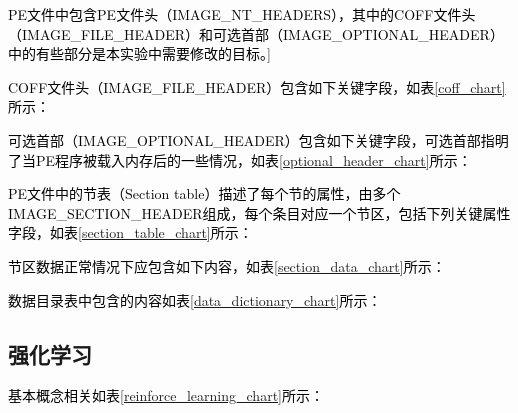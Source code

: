 \textcolor{black}{PE文件中包含PE文件头（IMAGE\_NT\_HEADERS），其中的COFF文件头（IMAGE\_FILE\_HEADER）和可选首部（IMAGE\_OPTIONAL\_HEADER）中的有些部分是本实验中需要修改的目标。}]

\textcolor{black}{COFF文件头（IMAGE\_FILE\_HEADER）包含如下关键字段，如表\ref{coff_chart}所示：}

\textcolor{black}{可选首部（IMAGE\_OPTIONAL\_HEADER）包含如下关键字段，可选首部指明了当PE程序被载入内存后的一些情况，如表\ref{optional_header_chart}所示：}


\textcolor{black}{PE文件中的节表（Section table）描述了每个节的属性，由多个IMAGE\_SECTION\_HEADER组成，每个条目对应一个节区，包括下列关键属性字段，如表\ref{section_table_chart}所示：}

\textcolor{black}{节区数据正常情况下应包含如下内容，如表\ref{section_data_chart}所示：}

\textcolor{black}{数据目录表中包含的内容如表\ref{data_dictionary_chart}所示：}

\subsection{强化学习}

\textcolor{black}{基本概念相关如表\ref{reinforce_learning_chart}所示：}

